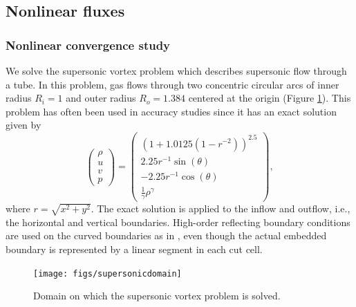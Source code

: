 \subsection{Nonlinear fluxes}
\subsubsection{Nonlinear convergence study}
We solve the supersonic vortex problem which describes supersonic flow 
through a tube.  In this problem, gas flows through two concentric circular arcs of inner radius $R_i = 1$ and outer radius $R_o = 1.384$ centered at the origin (Figure \ref{fig:supersonicdomain}).
This problem has often been used in accuracy 
studies \cite{aftosmis:acc} since it has an exact solution given by 
$$
\begin{pmatrix}
\rho\\
u \\
v \\
p
\end{pmatrix} = \begin{pmatrix}
\left (1 + 1.0125(1-r^{-2}) \right)^{2.5}\\
2.25r^{-1}\sin(\theta)\\
-2.25r^{-1}\cos(\theta)\\
\frac{1}{\gamma}\rho^{\gamma}
\end{pmatrix},
$$
where $r = \sqrt{x^2+y^2}$.  
The exact solution is applied to the inflow 
and outflow, i.e., the horizontal and vertical boundaries. 
High-order reflecting boundary conditions are used on the curved
boundaries as in \cite{}, even though  the  actual embedded boundary is
represented by a linear segment in each cut cell.  

\begin{figure}
	\centering
	\texttt{[image: figs/supersonicdomain]}
	\caption{Domain on which the supersonic vortex problem is solved.}
	\label{fig:supersonicdomain}
\end{figure}


